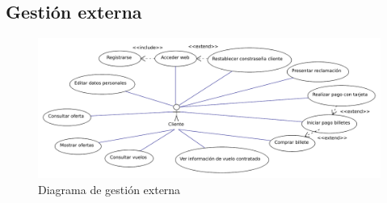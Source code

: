 \documentclass[11pt, a4paper, twoside, titlepage]{article}
\begin{document}
	
	
	
	
	
	
	
	
	
	
	
	
	
	
	
	
	
	
	
	
	
	
	
	
	
	
	
	
	\subsection{Gestión externa} \vspace{.5cm}

	\ifpdf
	\begin{figure}
		\includegraphics[scale=.92]{diagramas/gestionexterna.pdf}
		\caption{Diagrama de gestión externa}
	\end{figure}
	\fi

	
	
	
	
	
	
	
	
	
	
	
	
	
\end{document}

